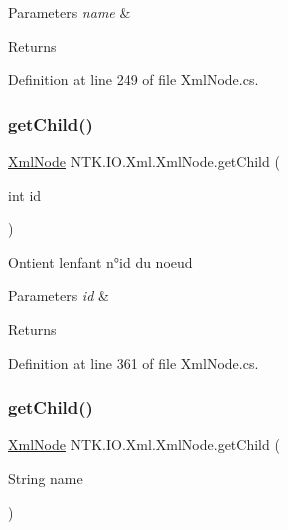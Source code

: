 \begin{DoxyParams}{Parameters}
{\em name} & \\
\hline
\end{DoxyParams}
\begin{DoxyReturn}{Returns}

\end{DoxyReturn}


Definition at line 249 of file Xml\+Node.\+cs.

\mbox{\label{class_n_t_k_1_1_i_o_1_1_xml_1_1_xml_node_afdf43970beeaf6d1d5a628e93f69c0c0}} 
\subsubsection{\texorpdfstring{getChild()}{getChild()}\hspace{0.1cm}{\footnotesize\ttfamily [1/2]}}
{\footnotesize\ttfamily \mbox{\hyperlink{class_n_t_k_1_1_i_o_1_1_xml_1_1_xml_node}{Xml\+Node}} N\+T\+K.\+I\+O.\+Xml.\+Xml\+Node.\+get\+Child (\begin{DoxyParamCaption}\item[{int}]{id }\end{DoxyParamCaption})}



Ontient l\textquotesingle{}enfant n°id du noeud 


\begin{DoxyParams}{Parameters}
{\em id} & \\
\hline
\end{DoxyParams}
\begin{DoxyReturn}{Returns}

\end{DoxyReturn}


Definition at line 361 of file Xml\+Node.\+cs.

\mbox{\label{class_n_t_k_1_1_i_o_1_1_xml_1_1_xml_node_a38197c374ba008fd421414e593a39705}} 
\subsubsection{\texorpdfstring{getChild()}{getChild()}\hspace{0.1cm}{\footnotesize\ttfamily [2/2]}}
{\footnotesize\ttfamily \mbox{\hyperlink{class_n_t_k_1_1_i_o_1_1_xml_1_1_xml_node}{Xml\+Node}} N\+T\+K.\+I\+O.\+Xml.\+Xml\+Node.\+get\+Child (\begin{DoxyParamCaption}\item[{String}]{name }\end{DoxyParamCaption})}



